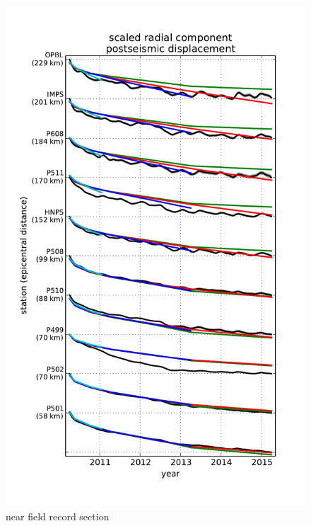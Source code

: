 \documentclass[12pt]{article}
\begin{document}
\begin{figure}
\includegraphics[scale=0.9]{Figures/near_field_record_section}
\centering 
\caption{near field record section}
\label{NearFieldRS}
\end{figure}
\end{document}
